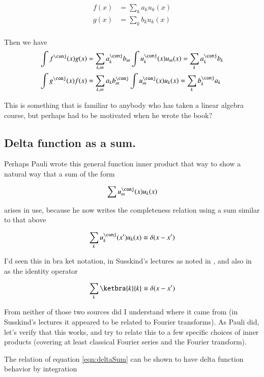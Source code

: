 \documentclass{article}
\begin{document}
\begin{align*}
f(x) &= \sum_k a_k u_k(x) \\
g(x) &= \sum_k b_k u_k(x) \\
\end{align*}

Then we have 
\begin{align*}
\int f^\conj(x) g(x) &= \sum_{k,m} a_k^\conj b_m \int u_k^\conj(x) u_m(x) = \sum_k a_k^\conj b_k \\
\int g^\conj(x) f(x) &= \sum_{k,m} a_k b_m^\conj \int u_m^\conj(x) u_k(x) = \sum_k b_k^\conj a_k \\
\end{align*}

This is something that is familiar to anybody who has taken a linear
algebra course, but perhaps had to be motivated when he wrote the book?

\subsection{Delta function as a sum. }

Perhaps Pauli wrote this general function inner product that way to show a natural way that a sum of the
form

\begin{align*}
\sum u_m^\conj(x) u_k(x)
\end{align*}

arises in use, because he now writes the completeness relation using a sum similar to that above

\begin{align}\label{eqn:deltaSum}
\sum_{k} u_k^\conj(x') u_k(x) \equiv \delta(x-x') 
\end{align}

I'd seen this in bra ket notation, in Susskind's lectures as noted in \cite{PJQmSusskind}, and also in \cite{mcmahon2005qmd} as the
identity operator

\begin{align}
\sum_{k} \ketbra{k}{k} \equiv \delta(x-x') 
\end{align}

From neither of those two sources did I understand where it came from (in Susskind's lectures it appeared to be
related to Fourier transforms).
As Pauli did, let's verify that this works, and try to relate this to a few specific choices of inner products (covering at
least classical Fourier series and the Fourier transform).

The relation of equation \ref{eqn:deltaSum} can be shown to have delta function behavior by integration
\end{document}
